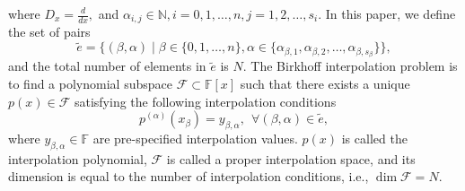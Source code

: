 \documentclass[preprint,12pt]{elsarticle}
\begin{document}
where $D_x=\frac{d}{dx},$ and $\alpha_{i,j} \in \mathbb{N}, i=0,1,\dots,n, j=1,2,\dots,s_i.$
In this paper, we define the set of pairs
\begin{equation}\label{formula:e}
 \tilde e= \{(\beta, \alpha) \mid \beta  \in \{0,1,\dots,n\},\alpha \in \{\alpha_{\beta,1},\alpha_{\beta,2},\dots,\alpha_{\beta,s_{\beta}}\} \},
 \end{equation}
and the total number of elements in $\tilde e$ is $N$.
The Birkhoff interpolation problem is to find a polynomial subspace $\mathcal{F}\subset \mathbb{F}[x]$ such that there exists a unique $p(x)\in \mathcal{F}$ satisfying the following interpolation conditions
\begin{equation*}
  p^{(\alpha)}(x_\beta)=y_{\beta, \alpha},~~ \forall (\beta, \alpha) \in \tilde e ,  
\end{equation*}
where $y_{\beta, \alpha}\in \mathbb{F}$ are pre-specified interpolation values. \( p(x) \)  is called the interpolation polynomial,
 \( \mathcal{F} \) is called a proper interpolation space, and its dimension is equal to the number of interpolation conditions, i.e., $\dim{\mathcal{F}}=N.$
\end{document}
